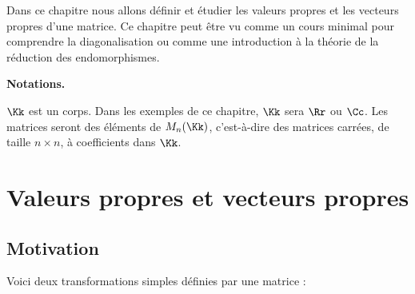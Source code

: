 \documentclass[11pt, class=report,crop=false]{standalone}
\begin{document}


Dans ce chapitre nous allons définir et étudier les valeurs propres et 
les vecteurs propres d'une matrice.
Ce chapitre peut être vu comme un cours minimal pour comprendre la diagonalisation ou comme une 
introduction à la théorie de la réduction des endomorphismes.

\bigskip

\textbf{Notations.}


$\Kk$ est un corps. Dans les exemples de ce chapitre, $\Kk$ sera $\Rr$ ou $\Cc$.
Les matrices seront des éléments de $M_n(\Kk)$, c'est-à-dire des matrices carrées, de taille $n\times n$, à coefficients dans $\Kk$. 





\section{Valeurs propres et vecteurs propres}


\subsection{Motivation}

Voici deux transformations simples définies par une matrice :
\end{document}
